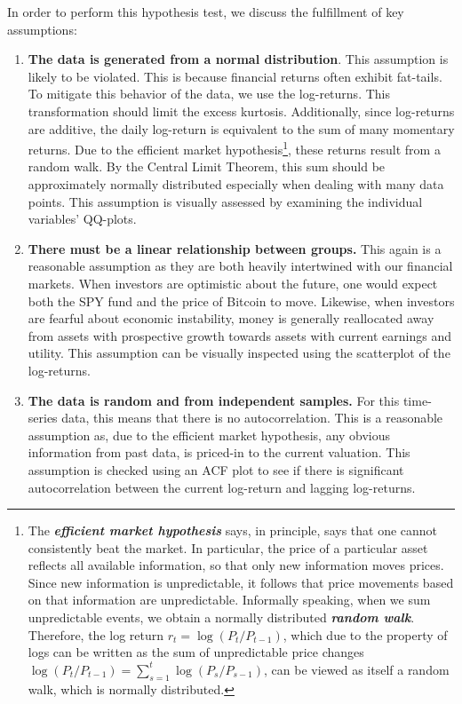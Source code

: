 \documentclass[12pt]{article}
\begin{document}
		In order to perform this hypothesis test, we discuss the fulfillment of key assumptions: 
			\begin{enumerate}
				\item \textbf{The data is generated from a normal distribution}. This assumption is likely to be violated. This is because financial returns often exhibit fat-tails. To mitigate this behavior of the data, we use the log-returns. This transformation should limit the excess kurtosis. Additionally, since log-returns are additive, the daily log-return is equivalent to the sum of many momentary returns. Due to the efficient market hypothesis\footnote{The \textbf{\textit{efficient market hypothesis}} says, in principle, says that one cannot consistently beat the market. In particular, the price of a particular asset reflects all available information, so that only new information moves prices. Since new information is unpredictable, it follows that price movements based on that information are unpredictable. Informally speaking, when we sum unpredictable events, we obtain a normally distributed \textbf{\textit{random walk}}. Therefore, the log return $r_t = \log(P_t/P_{t - 1})$, which due to the property of logs can be written as the sum of unpredictable price changes $\log(P_t/P_{t - 1}) = \sum_{s = 1}^t\log(P_s/P_{s - 1})$, can be viewed as itself a random walk, which is normally distributed.}, these returns result from a random walk. By the Central Limit Theorem, this sum should be approximately normally distributed especially when dealing with many data points. This assumption is visually assessed by examining the individual variables’ QQ-plots.
				\item \textbf{There must be a linear relationship between groups.}  This again is a reasonable assumption as they are both heavily intertwined with our financial markets. When investors are optimistic about the future, one would expect both the SPY fund and the price of Bitcoin to move. Likewise, when investors are fearful about economic instability, money is generally reallocated away from assets with prospective growth towards assets with current earnings and utility. This assumption can be visually inspected using the scatterplot of the log-returns.
				\item \textbf{The data is random and from independent samples.} For this time-series data, this means that there is no autocorrelation. This is a reasonable assumption as, due to the efficient market hypothesis, any obvious information from past data, is priced-in to the current valuation. This assumption is checked using an ACF plot to see if there is significant autocorrelation between the current log-return and lagging log-returns. 
			\end{enumerate}
		
\end{document}
